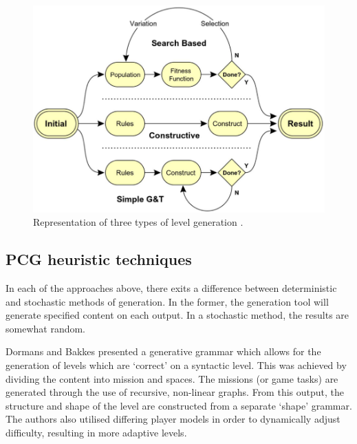 \documentclass[11pt, a4paper, oneside]{report} %
\begin{document}
\begin{figure}[h!]

  \centering
    \includegraphics[scale=0.35]{lvlgenmethods}
  \caption{Representation of three types of level generation \cite{5756645}.}
  \label{level}
\end{figure}


\subsection{PCG heuristic techniques}

In each of the approaches above, there exits a difference between deterministic
and stochastic methods of generation. In the former, the generation tool will
generate specified content on each output. In a stochastic method, the results
are somewhat random.

Dormans and Bakkes \@\cite{dormans2011generating} presented a generative grammar
which allows for the generation of levels which are `correct' on a syntactic
level. This was achieved by dividing the content into mission and spaces. The
missions (or game tasks) are generated through the use of recursive, non-linear
graphs. From this output, the structure and shape of the level are constructed
from a separate `shape' grammar. The authors also utilised differing player
models in order to dynamically adjust difficulty, resulting in more adaptive
levels.


\end{document}
